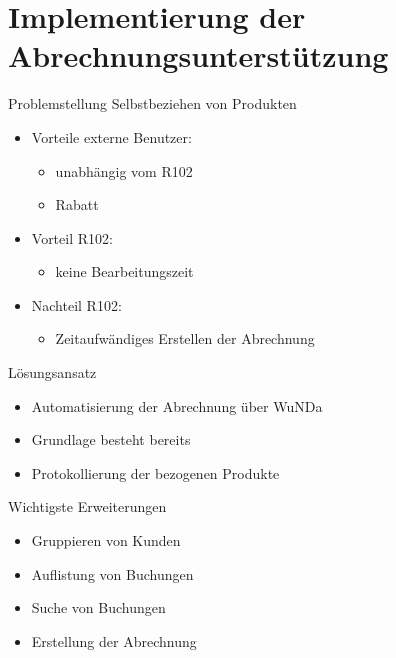 \documentclass{beamer}
\begin{document}
\section{Implementierung der Abrechnungsunterstützung}

\begin{frame}{Problemstellung}
  Selbstbeziehen von Produkten \pause	  
  \begin{itemize}
  \item Vorteile externe Benutzer: 
  \begin{itemize}
  	\item unabhängig vom R102 \pause
  	\item Rabatt \pause
  \end{itemize}
  \item<4-> Vorteil R102:
  \begin{itemize}
  \item keine Bearbeitungszeit
  \end{itemize}
  \item<5-> Nachteil R102:
  \begin{itemize}
  \item Zeitaufwändiges Erstellen der Abrechnung
  \end{itemize}
  \end{itemize}
\end{frame}

\begin{frame}{Lösungsansatz}
  \begin{itemize}
  \item
    Automatisierung der Abrechnung über WuNDa
    \pause
  \item
    Grundlage besteht bereits \pause
  \item Protokollierung der bezogenen Produkte  
  \end{itemize}
\end{frame}

\begin{frame}{Wichtigste Erweiterungen}
  \begin{itemize}
  \item
    Gruppieren von Kunden
    \pause
  \item
    Auflistung von Buchungen \pause
  \item Suche von Buchungen \pause
  \item Erstellung der Abrechnung 
  \end{itemize}
  \bigskip
\end{frame}
\end{document}

